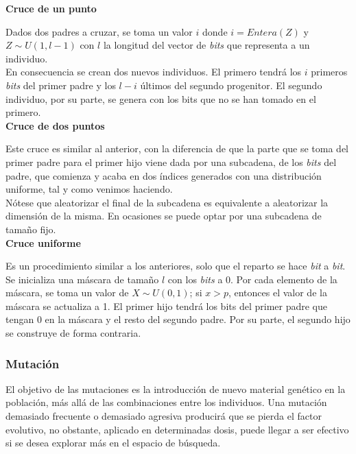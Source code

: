 			\textbf{Cruce de un punto}
			
			Dados dos padres a cruzar, se toma un valor $i$ donde $i=Entera(Z)$ y $Z\sim U(1,l-1)$ con $l$ la longitud del vector de \textit{bits} que representa a un individuo. \\
			
			En consecuencia se crean dos nuevos individuos. El primero tendr\'a los $i$ primeros \textit{bits} del primer padre y los $l-i$ \'ultimos del segundo progenitor. El segundo individuo, por su parte, se genera con los bits que no se han tomado en el primero.\\
			
			\textbf{Cruce de dos puntos}

			Este cruce es similar al anterior, con la diferencia de que la parte que se toma del primer padre para el primer hijo viene dada por una subcadena, de los \textit{bits} del padre, que comienza y acaba en dos \'indices generados con una distribuci\'on uniforme, tal y como venimos haciendo.\\
			
			N\'otese que aleatorizar el final de la subcadena es equivalente a aleatorizar la dimensi\'on de la misma. En ocasiones se puede optar por una subcadena de tama\~no fijo. \\
			
			\textbf{Cruce uniforme}
			
			Es un procedimiento similar a los anteriores, solo que el reparto se hace \textit{bit} a \textit{bit}. Se inicializa una m\'ascara de tama\~no $l$ con los \textit{bits} a 0. Por cada elemento de la m\'ascara, se toma un valor de $X \sim U(0,1)$; si $x > p$, entonces el valor de la m\'ascara se actualiza a 1. El primer hijo tendr\'a los bits del primer padre que tengan 0 en la m\'ascara y el resto del segundo padre. Por su parte, el segundo hijo se construye de forma contraria. \\
			
			
			\subsubsection{Mutaci\'on}

			El objetivo de las mutaciones es la introducci\'on de nuevo material gen\'etico en la poblaci\'on, m\'as all\'a de las combinaciones entre los individuos. Una mutaci\'on demasiado frecuente o demasiado agresiva producir\'a que se pierda el factor evolutivo, no obstante, aplicado en determinadas dosis, puede llegar a ser efectivo si se desea explorar m\'as en el espacio de b\'usqueda.\\
			

